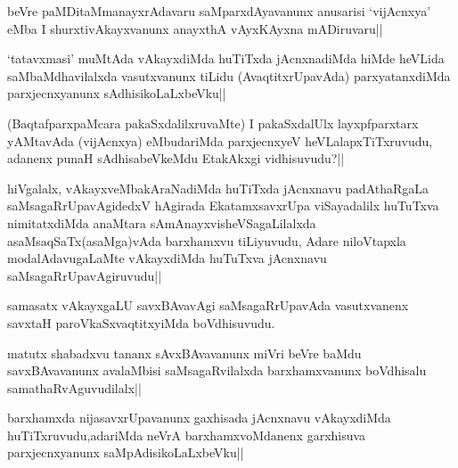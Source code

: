 
\begin{artha}
beVre paMDitaMmanayxrAdavaru saMparxdAyavanunx anusarisi `vijAcnxya' eMba I shurxtivAkayxvanunx anayxthA vAyxKAyxna mADiruvaru||
\end{artha}


\begin{artha}
`tatavxmasi' muMtAda vAkayxdiMda huTiTxda jAcnxnadiMda hiMde heVLida saMbaMdhavilalxda vasutxvanunx tiLidu (AvaqtitxrUpavAda) parxyatanxdiMda parxjecnxyanunx sAdhisikoLaLxbeVku||
\end{artha}


\begin{artha}
(BaqtafparxpaMcara pakaSxdalilxruvaMte) I pakaSxdalUlx layxpfparxtarx yAMtavAda (vijAcnxya) eMbudariMda parxjecnxyeV heVLalapxTiTxruvudu, adanenx punaH sAdhisabeVkeMdu EtakAkxgi vidhisuvudu?||
\end{artha}

\begin{artha}
hiVgalalx, vAkayxveMbakAraNadiMda huTiTxda jAcnxnavu padAthaRgaLa saMsagaRrUpavAgidedxV hAgirada EkatamxsavxrUpa viSayadalilx huTuTxva nimitatxdiMda anaMtara sAmAnayxvisheVSagaLilalxda asaMsaqSaTx(asaMga)vAda barxhamxvu tiLiyuvudu, Adare niloVtapxla modalAdavugaLaMte vAkayxdiMda huTuTxva jAcnxnavu saMsagaRrUpavAgiruvudu||
\end{artha}


\begin{artha}
samasatx vAkayxgaLU savxBAvavAgi saMsagaRrUpavAda vasutxvanenx savxtaH paroVkaSxvaqtitxyiMda boVdhisuvudu.
\end{artha}

\begin{artha}
matutx shabadxvu tananx sAvxBAvavanunx miVri beVre baMdu savxBAvavanunx avalaMbisi saMsagaRvilalxda barxhamxvanunx boVdhisalu samathaRvAguvudilalx||
\end{artha}

\begin{artha}
barxhamxda nijasavxrUpavanunx gaxhisada jAcnxnavu vAkayxdiMda huTiTxruvudu,adariMda neVrA barxhamxvoMdanenx garxhisuva parxjecnxyanunx saMpAdisikoLaLxbeVku||
\end{artha}

